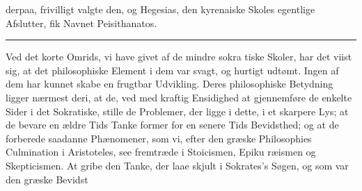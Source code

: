 \documentclass[12pt,a4paper]{book}
\newcommand{\divrule}{\begin{center}\rule{2cm}{0.4pt}\end{center}}
\begin{document}
derpaa, frivilligt valgte den, og Hegesias, den kyrenaiske Skoles
egentlige Afslutter, fik Navnet Peisithanatos.
\divrule
Ved det korte Omrids, vi have givet af de mindre sokra\-%
tiske Skoler, har det viist sig, at det philosophiske Element i
dem var svagt, og hurtigt udtømt. Ingen af dem har kunnet
skabe en frugtbar Udvikling. Deres philosophiske Betydning ligger
nærmest deri, at de, ved med kraftig Ensidighed at gjennemføre
de enkelte Sider i det Sokratiske, stille de Problemer, der ligge i
dette, i et skarpere Lys; at de bevare en ældre Tids Tanke\-%
former for en senere Tids Bevidsthed; og at de forberede
saadanne Phænomener, som vi, efter den græske Philosophies
Culmination i Aristoteles, see fremtræde i Stoicismen, Epiku\-%
ræismen og Skepticismen. At gribe den Tanke, der laae
skjult i Sokrates's Søgen, og som var den græske Bevidst\-%
%
\end{document}
